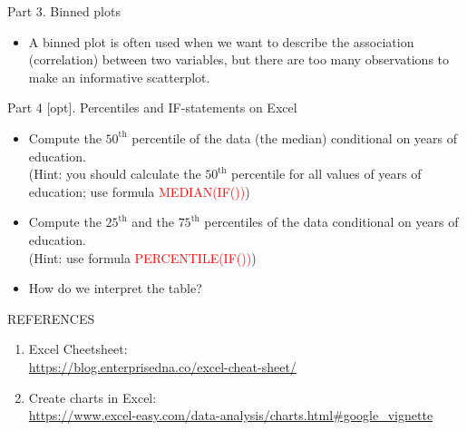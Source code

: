 \documentclass[
  10pt,
  ignorenonframetext,
]{beamer}
\providecommand{\tightlist}{%
  \setlength{\itemsep}{0pt}\setlength{\parskip}{0pt}}
\begin{document}
\begin{frame}{Part 3. Binned plots}
\protect\hypertarget{part-3.-binned-plots-2}{}
\begin{itemize}
\tightlist
\item
  A binned plot is often used when we want to describe the association
  (correlation) between two variables, but there are too many
  observations to make an informative scatterplot.
\end{itemize}
\end{frame}

\begin{frame}{Part 4 {[}opt{]}. Percentiles and IF-statements on Excel}
\protect\hypertarget{part-4-opt.-percentiles-and-if-statements-on-excel}{}
\begin{itemize}
\tightlist
\item
  Compute the \(50^{\text{th}}\) percentile of the data (the median)
  conditional on years of education.\\
  (Hint: you should calculate the \(50^{\text{th}}\) percentile for all
  values of years of education; use formula
  \textcolor{red}{MEDIAN(IF())})
\item
  Compute the \(25^{\text{th}}\) and the \(75^{\text{th}}\) percentiles
  of the data conditional on years of education.\\
  (Hint: use formula \textcolor{red}{PERCENTILE(IF())})
\item
  How do we interpret the table?
\end{itemize}
\end{frame}

\begin{frame}{REFERENCES}
\protect\hypertarget{references}{}
\begin{enumerate}
\item
  Excel Cheetsheet:\\
  \url{https://blog.enterprisedna.co/excel-cheat-sheet/}
\item
  Create charts in Excel:\\
  \url{https://www.excel-easy.com/data-analysis/charts.html\#google_vignette}
\end{enumerate}
\end{frame}
\end{document}
